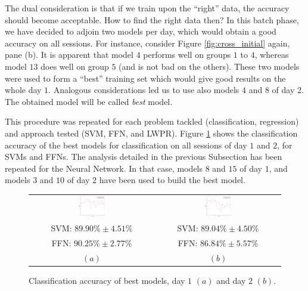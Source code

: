 
The dual consideration is that if we train upon the ``right'' data,
the accuracy should become acceptable. How to find the right data
then? In this batch phase, we have decided to adjoin two models per
day, which would obtain a good accuracy on all sessions. For instance,
consider Figure \ref{fig:cross_initial} again, pane (b). It is
apparent that model $4$ performs well on groups $1$ to $4$, whereas
model $13$ does well on group $5$ (and is not bad on the
others). These two models were used to form a ``best'' training set
which would give good results on the whole day $1$. Analogous
considerations led us to use also models $4$ and $8$ of day $2$. The
obtained model will be called \emph{best} model.

This procedure was repeated for each problem tackled (classification,
regression) and approach tested (SVM, FFN, and LWPR). Figure
\ref{fig:best_class} shows the classification accuracy of the best
models for classification on all sessions of day $1$ and $2$, for SVMs
and FFNs. The analysis detailed in the previous Subsection has been
repeated for the Neural Network. In that case, models $8$ and $15$ of
day $1$, and models $3$ and $10$ of day $2$ have been used to build
the best model.

\begin{figure}[!ht] \centering
  \begin{tabular}{cc}
    \includegraphics[width=0.22\textwidth]{figs/fig_class_resCrossBestOnDay1} &
    \includegraphics[width=0.22\textwidth]{figs/fig_class_resCrossBestOnDay2} \\
    SVM: $89.90\% \pm 4.51\%$ & SVM: $89.04\% \pm 4.50\%$ \\
    FFN: $90.25\% \pm 2.77\%$ & FFN: $86.84\% \pm 5.57\%$ \\
    $(a)$ & $(b)$ \\
  \end{tabular}
  \caption{Classification accuracy of best models, day $1$ $(a)$ and
    day $2$ $(b)$.}
  \label{fig:best_class}
\end{figure}

